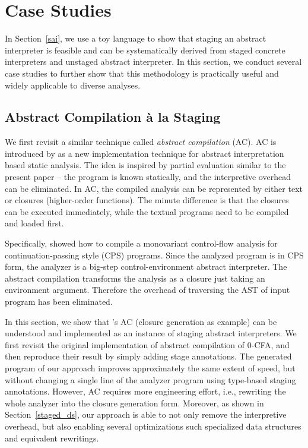 \section{Case Studies} \label{cases_study}

In Section~\ref{sai}, we use a toy language to show that staging an abstract
interpreter is feasible and can be systematically derived from staged concrete
interpreters and unstaged abstract interpreter.
In this section, we conduct several case studies to further show that this
methodology is practically useful and widely applicable to diverse analyses.

\subsection{Abstract Compilation \`a la Staging} \label{cs_ac}

We first revisit a similar technique called \textit{abstract compilation} (AC).
AC is introduced by \citet{Boucher:1996:ACN:647473.727587} as a new
implementation technique for abstract interpretation based static analysis.
The idea is inspired by partial evaluation similar to the present paper --
the program is known statically, and the interpretive overhead can be
eliminated. In AC, the compiled analysis can be represented by either text or
closures (higher-order functions). The minute difference is that the closures
can be executed immediately, while the textual programs need to be compiled and
loaded first.

Specifically, \citeauthor{Boucher:1996:ACN:647473.727587} showed how to compile a
monovariant control-flow analysis \cite{Shivers:1991:SSC:115865.115884,
Shivers:1988:CFA:53990.54007} for continuation-passing style (CPS) programs.
Since the analyzed program is in CPS form, the analyzer is a big-step
control-environment abstract interpreter. The abstract compilation transforms
the analysis as a closure just taking an environment argument. Therefore the
overhead of traversing the AST of input program has been eliminated.

In this section, we show that \citeauthor{Boucher:1996:ACN:647473.727587}'s AC
(closure generation as example) can be understood and implemented as an instance
of staging abstract interpreters. We first revisit the original implementation
of abstract compilation of 0-CFA, and then reproduce their result by simply
adding stage annotations.
The generated program of our approach improves approximately the same extent of
speed, but without changing a single line of the analyzer program using
type-based staging annotations. However, AC requires more engineering effort,
i.e., rewriting the whole analyzer into the closure generation form. Moreover,
as shown in Section~\ref{staged_ds}, our approach is able to not only remove the
interpretive overhead, but also enabling several optimizations such specialized
data structures and equivalent rewritings.

